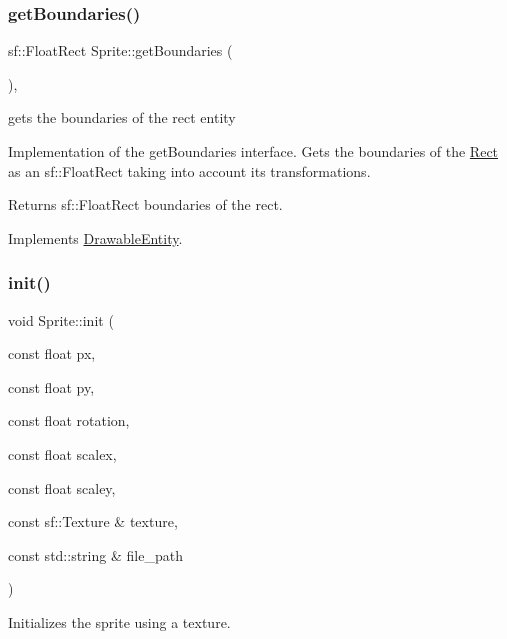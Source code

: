 \subsubsection{\texorpdfstring{get\+Boundaries()}{getBoundaries()}}
{\footnotesize\ttfamily sf\+::\+Float\+Rect Sprite\+::get\+Boundaries (\begin{DoxyParamCaption}{ }\end{DoxyParamCaption})\hspace{0.3cm}{\ttfamily [override]}, {\ttfamily [virtual]}}



gets the boundaries of the rect entity 

Implementation of the get\+Boundaries interface. Gets the boundaries of the \hyperlink{class_rect}{Rect} as an sf\+::\+Float\+Rect taking into account it\textquotesingle{}s transformations.

\begin{DoxyReturn}{Returns}
sf\+::\+Float\+Rect boundaries of the rect. 
\end{DoxyReturn}


Implements \hyperlink{class_drawable_entity_a352a101e3be05d25e1a10e5f72ccb9e3}{Drawable\+Entity}.

\mbox{\label{class_sprite_a4b50f5151037d0f43261d368f59102a2}} 
\subsubsection{\texorpdfstring{init()}{init()}\hspace{0.1cm}{\footnotesize\ttfamily [1/3]}}
{\footnotesize\ttfamily void Sprite\+::init (\begin{DoxyParamCaption}\item[{const float}]{px,  }\item[{const float}]{py,  }\item[{const float}]{rotation,  }\item[{const float}]{scalex,  }\item[{const float}]{scaley,  }\item[{const sf\+::\+Texture \&}]{texture,  }\item[{const std\+::string \&}]{file\+\_\+path }\end{DoxyParamCaption})}



Initializes the sprite using a texture. 

